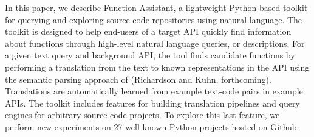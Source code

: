 In this paper, we describe Function Assistant, a lightweight Python-based toolkit for querying and exploring source code repositories using natural language. The toolkit is designed to help end-users of a target API quickly find information about functions through high-level natural language queries, or descriptions. For a given text query and background API, the tool finds candidate functions by performing a translation from the text to known representations in the API using the semantic parsing approach of (Richardson and Kuhn, forthcoming). Translations are automatically learned from example text-code pairs in example APIs. The toolkit includes features for building translation pipelines and query engines for arbitrary source code projects. To explore this last feature, we perform new experiments on 27 well-known Python projects hosted on Github.
